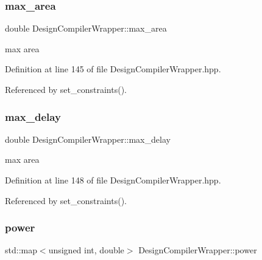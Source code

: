\subsubsection{\texorpdfstring{max\+\_\+area}{max\_area}}
{\footnotesize\ttfamily double Design\+Compiler\+Wrapper\+::max\+\_\+area\hspace{0.3cm}{\ttfamily [protected]}}



max area 



Definition at line 145 of file Design\+Compiler\+Wrapper.\+hpp.



Referenced by set\+\_\+constraints().

\mbox{\label{classDesignCompilerWrapper_aa64fc1193764925488f6de9e8f671fd8}} 
\subsubsection{\texorpdfstring{max\+\_\+delay}{max\_delay}}
{\footnotesize\ttfamily double Design\+Compiler\+Wrapper\+::max\+\_\+delay\hspace{0.3cm}{\ttfamily [protected]}}



max area 



Definition at line 148 of file Design\+Compiler\+Wrapper.\+hpp.



Referenced by set\+\_\+constraints().

\mbox{\label{classDesignCompilerWrapper_ad6ccfbedbee6b2b4399b47a6e4e19de7}} 
\subsubsection{\texorpdfstring{power}{power}}
{\footnotesize\ttfamily std\+::map$<$unsigned int, double$>$ Design\+Compiler\+Wrapper\+::power\hspace{0.3cm}{\ttfamily [protected]}}



